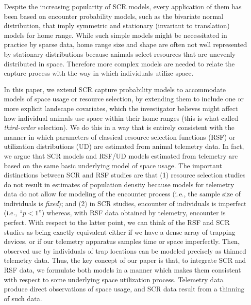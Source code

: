 \documentclass[12pt]{article}
\begin{document}
Despite the increasing popularity of SCR models, every
application of them has been based on encounter probability
models, such as the bivariate normal distribution, that imply
symmetric and stationary (invariant to translation) models for home range.
While such simple models might be necessitated in practice by sparse
data,
home range size and shape are often not well represented by stationary
distributions because animals select
resources
that
are unevenly distributed in space. Therefore
more complex models are needed to relate the capture
process with the way in which individuals utilize
space.

In this paper, we extend SCR capture probability models to accommodate
models of space usage or resource selection, by extending them to
include one or more explicit landscape covariates, which the
investigator believes might affect how individual animals use space
within their home ranges (this is what \citet{johnson:1980} called {\it
  third-order} selection). We do this in a way that is entirely
consistent with the manner in which parameters of classical resource
selection functions (RSF) \citep{manly_etal:2002} or utilization
distributions (UD) \citep{worton:1989, fieberg:2005, fieberg:2007} are
estimated from animal telemetry data.  In fact, we argue that SCR
models and RSF/UD models estimated from telemetry are based on the
same basic underlying model of space usage. The important distinctions
between SCR and RSF studies are that (1) resource selection studies do
not result in estimates of population density because models for
telemetry data do not allow for modeling of the encounter process
(i.e., the sample size of individuals is {\it fixed}); and (2) in SCR
studies, encounter of individuals is imperfect (i.e., ``$p<1$'')
whereas, with RSF data obtained by telemetry, encounter is perfect.
With respect to the latter point, we can think of the RSF and SCR
studies as being exactly equivalent either if we have a dense array of
trapping devices, or if our telemetry apparatus samples time or space
imperfectly.  Then, observed use by individuals of trap locations can
be modeled precisely as thinned telemetry data.  Thus, the key
concept of our paper is that, to
 integrate SCR and RSF data, we
formulate both models in a manner which makes them
consistent with respect to some underlying space utilization
process. Telemetry data produce direct observations of space usage,
and SCR data result from a thinning of such data.
\end{document}
